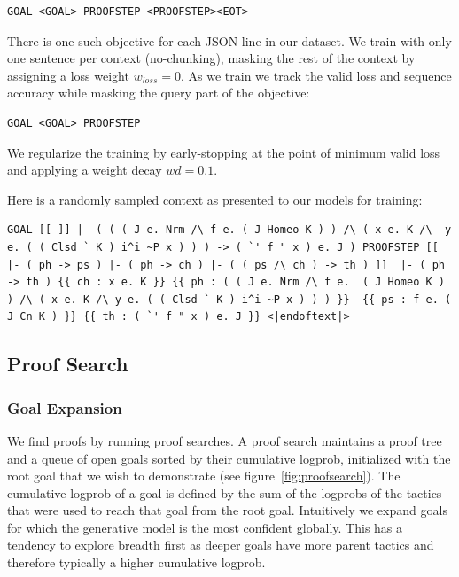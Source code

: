 \begin{verbatim}
GOAL <GOAL> PROOFSTEP <PROOFSTEP><EOT>
\end{verbatim}

There is one such objective for each JSON line in our dataset. We train with only one sentence per context (no-chunking), masking the rest of the context by assigning a loss weight $w_{\mathit{loss}}=0$. As we train we track the valid loss and sequence accuracy while masking the query part of the objective:

\begin{verbatim}
GOAL <GOAL> PROOFSTEP
\end{verbatim}

We regularize the training by early-stopping at the point of minimum valid loss and applying a weight decay $\mathit{wd}=0.1$.

Here is a randomly sampled context as presented to our models for training:

\begin{verbatim}
GOAL [[ ]] |- ( ( ( J e. Nrm /\ f e. ( J Homeo K ) ) /\ ( x e. K /\  y e. ( ( Clsd ` K ) i^i ~P x ) ) ) -> ( `' f " x ) e. J ) PROOFSTEP [[ |- ( ph -> ps ) |- ( ph -> ch ) |- ( ( ps /\ ch ) -> th ) ]]  |- ( ph -> th ) {{ ch : x e. K }} {{ ph : ( ( J e. Nrm /\ f e.  ( J Homeo K ) ) /\ ( x e. K /\ y e. ( ( Clsd ` K ) i^i ~P x ) ) ) }}  {{ ps : f e. ( J Cn K ) }} {{ th : ( `' f " x ) e. J }} <|endoftext|>
\end{verbatim}

\subsection{Proof Search}

\subsubsection{Goal Expansion} We find proofs by running proof searches. A proof search maintains a proof tree and a queue of open goals sorted by their cumulative logprob, initialized with the root goal that we wish to demonstrate (see figure~\ref{fig:proofsearch}). The cumulative logprob of a goal is defined by the sum of the logprobs of the tactics that were used to reach that goal from the root goal. Intuitively we expand goals for which the generative model is the most confident globally. This has a tendency to explore breadth first as deeper goals have more parent tactics and therefore typically a higher cumulative logprob.

